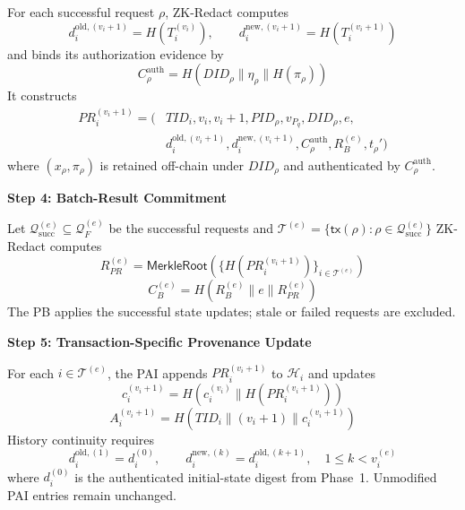 \documentclass[lettersize,journal]{IEEEtran}
\begin{document}
For each successful request $\rho$, ZK-Redact computes
\begin{equation}
d_i^{\mathrm{old},(v_i+1)}=H(T_i^{(v_i)}),\qquad
d_i^{\mathrm{new},(v_i+1)}=H(T_i^{(v_i+1)})
\label{eq:state-digests}
\end{equation}
and binds its authorization evidence by
\begin{equation}
C_\rho^{\mathrm{auth}}
=
H(DID_\rho\parallel\eta_\rho\parallel H(\pi_\rho))
\label{eq:authorization-evidence}
\end{equation}
It constructs
\begin{equation}
\begin{split}
PR_i^{(v_i+1)}
=\big(&TID_i,v_i,v_i+1,PID_\rho,v_{P_q},DID_\rho,e,\\
&d_i^{\mathrm{old},(v_i+1)},d_i^{\mathrm{new},(v_i+1)},
C_\rho^{\mathrm{auth}},R_B^{(e)},t_\rho'\big)
\end{split}
\label{eq:provenance-record}
\end{equation}
where $(x_\rho,\pi_\rho)$ is retained off-chain under $DID_\rho$ and
authenticated by $C_\rho^{\mathrm{auth}}$.

\smallskip
\noindent\textbf{Step 4: Batch-Result Commitment}

Let $\mathcal{Q}_{\mathrm{succ}}^{(e)}\subseteq\mathcal{Q}_F^{(e)}$
be the successful requests and
$\mathcal{T}^{(e)}
=\{\mathsf{tx}(\rho):\rho\in\mathcal{Q}_{\mathrm{succ}}^{(e)}\}$
ZK-Redact computes
\begin{equation}
R_{PR}^{(e)}
=
\mathsf{MerkleRoot}
\left(
\{H(PR_i^{(v_i+1)})\}_{i\in\mathcal{T}^{(e)}}
\right)
\end{equation}
\begin{equation}
C_B^{(e)}
=
H(R_B^{(e)}\parallel e\parallel R_{PR}^{(e)})
\end{equation}
The PB applies the successful state updates; stale or failed requests
are excluded.

\smallskip
\noindent\textbf{Step 5: Transaction-Specific Provenance Update}

For each $i\in\mathcal{T}^{(e)}$, the PAI appends
$PR_i^{(v_i+1)}$ to $\mathcal{H}_i$ and updates
\begin{equation}
c_i^{(v_i+1)}
=H\!\left(c_i^{(v_i)}\parallel H(PR_i^{(v_i+1)})\right)
\end{equation}
\begin{equation}
A_i^{(v_i+1)}
=H(TID_i\parallel(v_i+1)\parallel c_i^{(v_i+1)})
\label{eq:pai-update}
\end{equation}
History continuity requires
\begin{equation}
d_i^{\mathrm{old},(1)}=d_i^{(0)},\qquad
d_i^{\mathrm{new},(k)}=d_i^{\mathrm{old},(k+1)},
\quad 1\le k<v_i^{(e)}
\label{eq:history-continuity}
\end{equation}
where $d_i^{(0)}$ is the authenticated initial-state digest from
Phase~1. Unmodified PAI entries remain unchanged.
\end{document}
